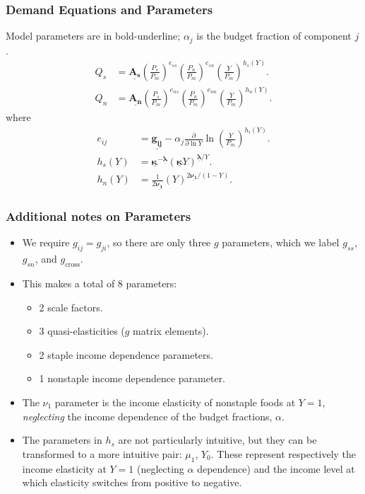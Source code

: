 \documentclass{beamer}
\begin{document}
\newcommand{\bmu}[1]{\underline{\boldsymbol{#1}}}

\begin{frame}
  \frametitle{Demand Equations and Parameters}
  Model parameters are in bold-underline; $\alpha_j$ is the budget
  fraction of component $j$.
    \begin{align}
    Q_s &=
    \bmu{A_s}\left(\frac{P_s}{P_m}\right)^{e_{ss}}\left(\frac{P_n}{P_m}\right)^{e_{sn}}\left(\frac{Y}{P_m}\right)^{h_s(Y)}.\\
    Q_n &=
    \bmu{A_n}\left(\frac{P_s}{P_m}\right)^{e_{ns}}\left(\frac{P_n}{P_m}\right)^{e_{nn}}\left(\frac{Y}{P_m}\right)^{h_n(Y)}.
    \end{align}
    where
    \begin{align}
      e_{ij} &= \bmu{g_{ij}} - \alpha_j
      \frac{\partial}{\partial \ln Y} \ln\left(\frac{Y}{P_m}\right)^{h_i(Y)}.\\
      h_s(Y) &= \bmu{\kappa}^{-\bmu{\lambda}}
      \left(\bmu{\kappa}Y\right)^{\bmu{\lambda}/Y}.\\
      h_n(Y) &= \frac{1}{2\bmu{\nu_1}}\left(Y\right)^{2\bmu{\nu_1}/\left(1-Y\right)}.
    \end{align}
\end{frame}

\begin{frame}
  \frametitle{Additional notes on Parameters}
  \begin{itemize}
    \item We require $g_{ij} = g_{ji}$, so there are only three $g$
      parameters, which we label $g_{ss}$, $g_{sn}$, and
      $g_{\text{cross}}$.
    \item This makes a total of 8 parameters:
      \begin{itemize}
      \item 2 scale factors.
      \item 3 quasi-elasticities ($g$ matrix elements).
      \item 2 staple income dependence parameters.
      \item 1 nonstaple income dependence parameter.
      \end{itemize}
    \item The $\nu_1$ parameter is the income elasticity of nonstaple
      foods at $Y=1$, \emph{neglecting} the income dependence of the
      budget fractions, $\alpha$.
    \item The parameters in $h_s$ are not particularly intuitive, but
      they can be transformed to a more intuitive pair: $\mu_1$,
      $Y_0$.  These represent respectively the income elasticity at
      $Y=1$ (neglecting $\alpha$ dependence) and the income level at
      which elasticity switches from positive to negative.
  \end{itemize}
\end{frame}
\end{document}
